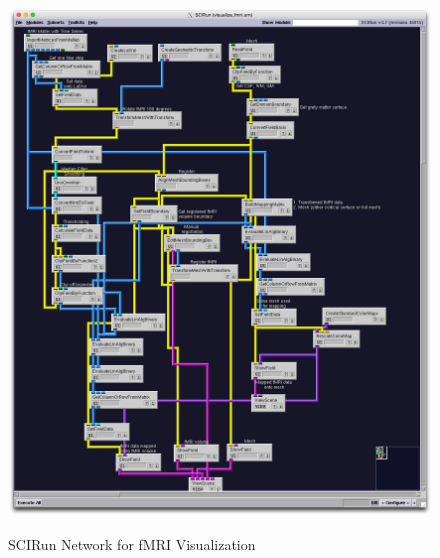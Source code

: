 \begin{figure}[p]
\begin{center}
\includegraphics[width=\textwidth]{Figures/fmri_network.png}\\
\caption{SCIRun Network for fMRI Visualization}
\label{fig:fmrivis}
\end{center}
\end{figure}

